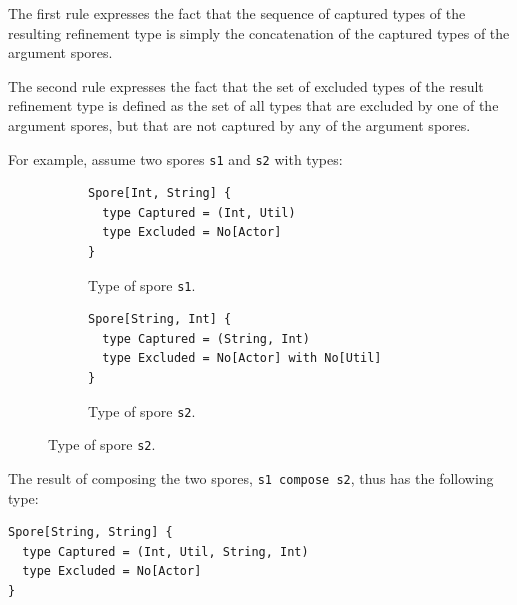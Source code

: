 \documentclass{llncs}
\begin{document}
The first rule expresses the fact that the sequence of captured types of the resulting refinement type is simply the concatenation of the captured types of the argument spores.

The second rule expresses the fact that the set of excluded types of the result refinement type is defined as the set of all types that are excluded by one of the argument spores, but that are not captured by any of the argument spores.

For example, assume two spores \verb|s1| and \verb|s2| with types:

\begin{figure}[h!]
\vspace{0.5mm}
\begin{subfigure}{.5\textwidth}
  \centering
  \begin{lstlisting}
Spore[Int, String] {
  type Captured = (Int, Util)
  type Excluded = No[Actor]
}
  \end{lstlisting}
  \vspace{-4mm}
  \caption{Type of spore \texttt{s1}.}
\end{subfigure}%
\begin{subfigure}{.5\textwidth}
  \centering
  \begin{lstlisting}
Spore[String, Int] {
  type Captured = (String, Int)
  type Excluded = No[Actor] with No[Util]
}
  \end{lstlisting}
  \vspace{-4mm}
  \caption{Type of spore \texttt{s2}.}
\end{subfigure}%
\label{fig:spore-composition}
\vspace{0.5mm}
\end{figure}


\noindent
The result of composing the two spores, \verb|s1 compose s2|, thus has the following type:

\begin{lstlisting}
Spore[String, String] {
  type Captured = (Int, Util, String, Int)
  type Excluded = No[Actor]
}
\end{lstlisting}
\end{document}
